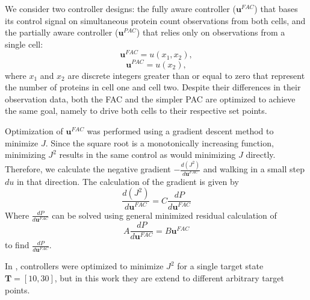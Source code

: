 \documentclass[12pt]{iopart}
\begin{document}
We consider two controller designs: the fully aware controller ($\mathbf{u}^{FAC}$) that bases its control signal on simultaneous protein count observations from both cells, and the partially aware controller ($\mathbf{u}^{PAC}$) that relies only on observations from a single cell:
\begin{equation}
\mathbf{u}^{FAC}=u(x_1,x_2),
\end{equation}
\begin{equation}
\mathbf{u}^{PAC}=u(x_2),
\end{equation}
where $x_1$ and $x_2$ are discrete integers greater than or equal to zero that represent the number of proteins in cell one and cell two. Despite their differences in their observation data, both the FAC and the simpler PAC are optimized to achieve the same goal, namely to drive both cells to their respective set points.

Optimization of $\mathbf{u}^{FAC}$ was performed using a gradient descent method to minimize $J$. Since the square root is a monotonically increasing function, minimizing $J^2$ results in the same control as would minimizing $J$ directly. Therefore, we calculate the negative gradient $-\frac{d(J^2)}{d\mathbf{u}^{FAC}}$ and walking in a small step $du$ in that direction. The calculation of the gradient is given by
\begin{equation}
\frac{d(J^2)}{d\mathbf{u}^{FAC}}=C \frac{dP}{d\mathbf{u}^{FAC}}
\end{equation}
Where $\frac{dP}{d\mathbf{u}^{FAC}}$ can be solved using general minimized residual calculation of
\begin{equation}
A \frac{dP}{d\mathbf{u}^{FAC}}=B \mathbf{u}^{FAC}
\end{equation}
to find $\frac{dP}{d\mathbf{u}^{FAC}}$.



In \cite{May2021}, controllers were optimized to minimize $J^2$ for a single target state $\mathbf{T} = [10,30]$, but in this work they are extend to different arbitrary target points.
\end{document}
